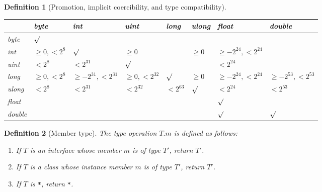 \makeatletter{}\documentclass[10pt,oneside]{book}
\theoremstyle{note}
\newtheorem{definition}{Definition}[section]
\begin{document}
\begin{definition}[Promotion, implicit coercibility, and type compatibility]
\begin{enumerate}
\begin{center}
\begin{tabular}{| l | l | l | l | l | l | l | l |}
\hline
      & byte & int & uint & long & ulong & float & double \\ 
\hline
  byte    & $\surd$ & & & & & & \\
\hline
  int     & $\geq 0, < 2^8$ & $\surd$ & $\geq 0$ & & $\geq 0$ & $\geq-2^{24}, < 2^{24}$ &  \\
\hline
  uint     & $< 2^8$ & $<2^{31}$ & $\surd$ & & & $<2^{24}$ &  \\
\hline 
  long      & $\geq 0, < 2^8$ & $\geq -2^{31}, < 2^{31}$ & $\geq 0, <
  2^{32}$ & $\surd$ & $\geq 0$ & $\geq-2^{24}, < 2^{24}$ &  $\geq-2^{53}, <
  2^{53}$ \\
\hline 
  ulong      & $< 2^8$ & $< 2^{31}$ & $< 2^{32}$ & $< 2^{63}$ & $\surd$ & $< 2^{24}$ &  $<2^{53}$\\
\hline 
  float      & & & & & & $\surd$ &  \\
\hline 
  double      & & & & & & $\surd$ & $\surd$  \\
\hline
\end{tabular}
\end{center}
\end{enumerate}

\end{definition}

\begin{definition}[Member type] The type operation $T.m$ is defined as
  follows:
\begin{enumerate}
\item If $T$ is an interface whose member $m$ is of type $T'$, return $T'$.
\item If $T$ is a class whose instance member $m$ is of type $T'$, return $T'$.
\item If $T$ is \verb'*', return \verb'*'.
\end{enumerate}
\end{definition}
\end{document}
